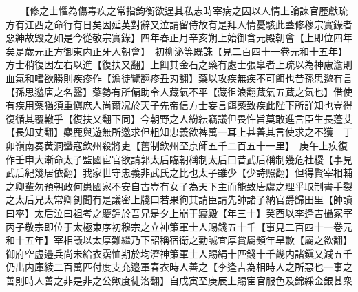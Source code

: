 　　【修之士懼為傷毒疾之常指鈞衡欲逞其私志時宰病之因以人情上論諫官歷獻疏方有江西之命行有日矣因延英對辭又泣請留侍故有是拜人情憂駭此蓋修穆宗實錄者惡紳故毁之如是今從敬宗實錄】四年春正月辛亥朔上始御含元殿朝會【上即位四年矣是歲元正方御東内正牙人朝會】　初柳泌等既誅【見二百四十一卷元和十五年】方士稍復因左右以進【復扶又翻】上餌其金石之藥有處士張臯者上疏以為神慮澹則血氣和嗜欲勝則疾疹作【澹徒覽翻疹丑刃翻】藥以攻疾無疾不可餌也昔孫思邈有言【孫思邈唐之名醫】藥勢有所偏助令人藏氣不平【藏徂浪翻藏氣五藏之氣也】借使有疾用藥猶須重愼庶人尚爾况於天子先帝信方士妄言餌藥致疾此陛下所詳知也豈得復循其覆轍乎【復扶又翻下同】今朝野之人紛紜竊議但畏忤旨莫敢進言臣生長蓬艾【長知丈翻】麋鹿與遊無所邀求但粗知忠義欲裨萬一耳上甚善其言使求之不獲　丁卯嶺南奏黄洞蠻寇欽州殺將吏【舊制欽州至京師五千二百五十一里】　庚午上疾復作壬申大漸命太子監國宦官欲請郭太后臨朝稱制太后曰昔武后稱制幾危社稷【事見武后紀幾居依翻】我家世守忠義非武氏之比也太子雖少【少詩照翻】但得賢宰相輔之卿輩勿預朝政何患國家不安自古豈有女子為天下主而能致唐虞之理乎取制書手裂之太后兄太常卿釗聞有是議密上牋曰若果徇其請臣請先帥諸子納官爵歸田里【帥讀曰率】太后泣曰祖考之慶鍾於吾兄是夕上崩于寢殿【年三十】癸酉以李逢吉攝冢宰丙子敬宗即位于太極東序初穆宗之立神策軍士人賜錢五十千【事見二百四十一卷元和十五年】宰相議以太厚難繼乃下詔稱宿衛之勤誠宜厚賞屬頻年旱歉【屬之欲翻】御府空虚邉兵尚未給衣霑恤期於均濟神策軍士人賜絹十匹錢十千畿内諸鎭又減五千仍出内庫綾二百萬匹付度支充邉軍春衣時人善之【李逢吉為相時人之所惡也一事之善則時人善之非是非之公歟度徒洛翻】自戊寅至庚辰上賜宦官服色及錦綵金銀甚衆

